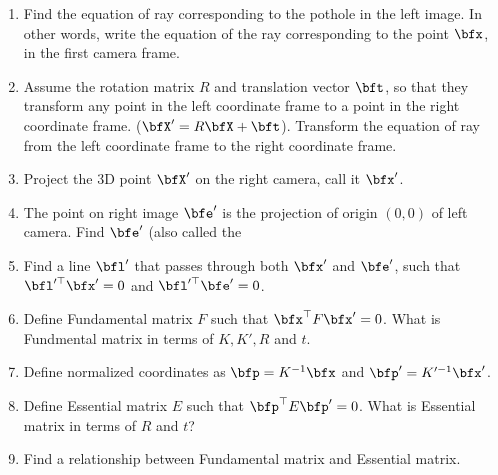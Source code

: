 \documentclass[times,singlecolumn]{article}
\begin{document}
\begin{enumerate}
\item Find the equation of ray corresponding to the pothole in the left image.
  In other words, write the equation of the ray corresponding to the point
  $\bfx$, in the first camera frame.
  \vspace{8em}

\item Assume the rotation matrix $R$ and translation vector $\bft$, so
  that they transform any point in the left coordinate frame to a point in the
  right coordinate frame. ($\bfX' = R \bfX+ \bft$). Transform the equation of
  ray from the left coordinate frame to the right coordinate frame.
  \vspace{8em}

\item Project the 3D point $\bfX'$ on the  right camera, call it $\bfx'$.
  \vspace{8em}

\item The point on right image $\bfe'$ is the projection of origin $(0, 0)$ of left
  camera. Find $\bfe'$ (also called the 
  \vspace{8em}

\item Find a line $\bfl'$ that passes through both $\bfx'$ and $\bfe'$, such
  that $\bfl'^\top \bfx' = 0$ and $\bfl'^\top \bfe' = 0$.
  \vspace{8em}

  \item Define Fundamental matrix $F$ such that $\bfx^\top F\bfx' = 0$. What is
    Fundmental matrix in terms of $K, K', R$ and $t$.
    \vspace{10em}

   \item Define normalized coordinates as $\bfp = K^{-1}\bfx$ and $\bfp' =
     K'^{-1} \bfx'$.
     \vspace{10em}

  \item Define Essential matrix $E$ such that $\bfp^\top E\bfp' = 0$. What is
    Essential matrix in terms of $ R$ and $t$?
    \vspace{10em}

  \item Find a relationship between Fundamental matrix and Essential matrix.
    \vspace{10em}
\end{enumerate}
\end{document}
